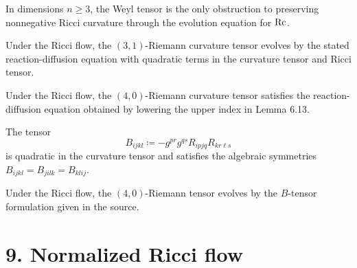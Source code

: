 \begin{remark}
\label{ch06-rem-weyl-obstruction}
In dimensions \(n\ge 3\), the Weyl tensor is the only obstruction to preserving nonnegative Ricci curvature through the evolution equation for \(\operatorname{Rc}\).
\end{remark}

\begin{lemma}
\label{ch06-lem-riemann-curvature-evolution}
Under the Ricci flow, the \((3,1)\)-Riemann curvature tensor evolves by the stated reaction-diffusion equation with quadratic terms in the curvature tensor and Ricci tensor.
\end{lemma}

\begin{corollary}
\label{ch06-cor-riemann-curvature-evolution-four-zero}
Under the Ricci flow, the \((4,0)\)-Riemann curvature tensor satisfies the reaction-diffusion equation obtained by lowering the upper index in Lemma 6.13.
\end{corollary}

\begin{lemma}
\label{ch06-lem-quadratic-tensor-B}
The tensor
\[
B_{ijkl} \coloneqq -g^{pr}g^{qs} R_{ipjq}R_{kr\ell s}
\]
is quadratic in the curvature tensor and satisfies the algebraic symmetries \(B_{ijkl}=B_{jilk}=B_{klij}\).
\end{lemma}

\begin{lemma}
\label{ch06-lem-alternative-riemann-evolution}
Under the Ricci flow, the \((4,0)\)-Riemann tensor evolves by the \(B\)-tensor formulation given in the source.
\end{lemma}

\section*{9. Normalized Ricci flow}

